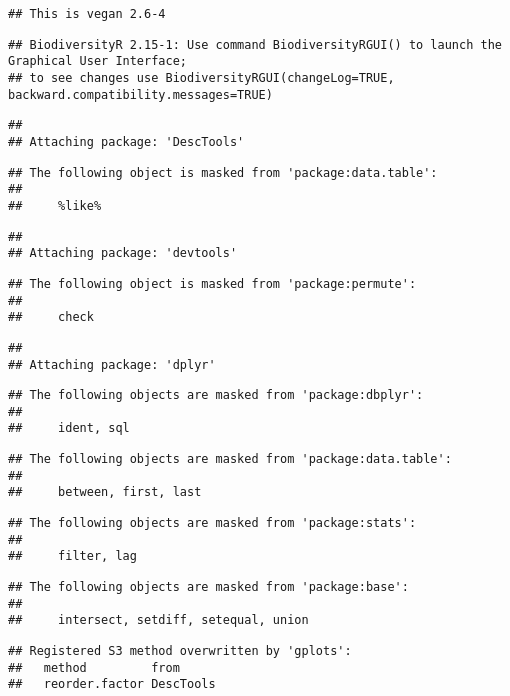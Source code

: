 \documentclass[
]{article}
\begin{document}
\begin{verbatim}
## This is vegan 2.6-4
\end{verbatim}

\begin{verbatim}
## BiodiversityR 2.15-1: Use command BiodiversityRGUI() to launch the Graphical User Interface; 
## to see changes use BiodiversityRGUI(changeLog=TRUE, backward.compatibility.messages=TRUE)
\end{verbatim}

\begin{verbatim}
## 
## Attaching package: 'DescTools'
\end{verbatim}

\begin{verbatim}
## The following object is masked from 'package:data.table':
## 
##     %like%
\end{verbatim}

\begin{verbatim}
## 
## Attaching package: 'devtools'
\end{verbatim}

\begin{verbatim}
## The following object is masked from 'package:permute':
## 
##     check
\end{verbatim}

\begin{verbatim}
## 
## Attaching package: 'dplyr'
\end{verbatim}

\begin{verbatim}
## The following objects are masked from 'package:dbplyr':
## 
##     ident, sql
\end{verbatim}

\begin{verbatim}
## The following objects are masked from 'package:data.table':
## 
##     between, first, last
\end{verbatim}

\begin{verbatim}
## The following objects are masked from 'package:stats':
## 
##     filter, lag
\end{verbatim}

\begin{verbatim}
## The following objects are masked from 'package:base':
## 
##     intersect, setdiff, setequal, union
\end{verbatim}

\begin{verbatim}
## Registered S3 method overwritten by 'gplots':
##   method         from     
##   reorder.factor DescTools
\end{verbatim}
\end{document}
